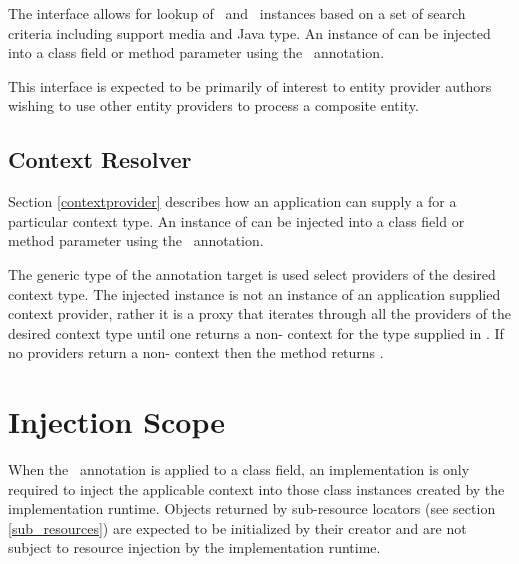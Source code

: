 The  interface allows for lookup of \MsgRead\ and \MsgWrite\ instances based on a set of search criteria including support media and Java type. An instance of  can be injected into a class field or method parameter using the \Context\ annotation.

This interface is expected to be primarily of interest to entity provider authors wishing to use other entity providers to process a composite entity.

\subsection{Context Resolver}
\label{contextresolver}

Section \ref{contextprovider} describes how an application can supply a  for a particular context type. An instance of  can be injected into a class field or method parameter using the \Context\ annotation. 

The generic type of the annotation target is used select providers of the desired context type. The injected instance is not an instance of an application supplied context provider, rather it is a proxy that iterates through all the providers of the desired context type until one returns a non- context for the type supplied in . If no providers return a non- context then the  method returns .

\section{Injection Scope}

When the \Context\ annotation is applied to a class field, an implementation is only required to inject the applicable context into those class instances created by the implementation runtime. Objects returned by sub-resource locators (see section \ref{sub_resources}) are expected to be initialized by their creator and are not subject to resource injection by the implementation runtime.

